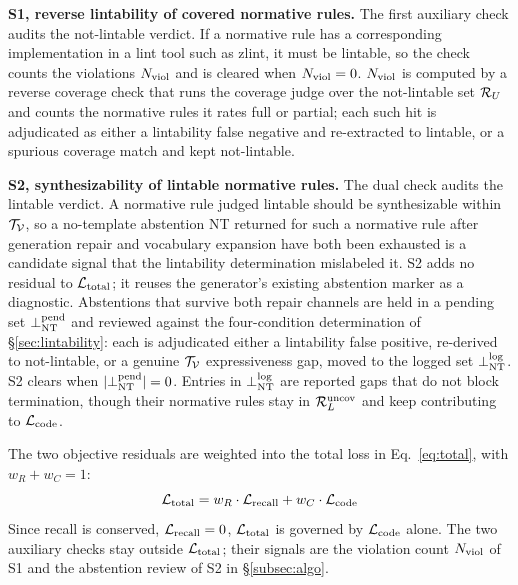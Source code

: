 \medskip
\noindent\textbf{S1, reverse lintability of covered normative rules.} The first
auxiliary check audits the not-lintable verdict. If a normative rule has a corresponding
implementation in a lint tool such as zlint, it must be lintable, so the check
counts the violations $N_{\mathrm{viol}}$ and is cleared when $N_{\mathrm{viol}} = 0$. $N_{\mathrm{viol}}$ is
computed by a reverse coverage check that runs the coverage judge over
the not-lintable set $\mathcal{R}_U$ and counts the normative rules it rates full or partial; each
such hit is adjudicated as either a lintability false negative and re-extracted to
lintable, or a spurious coverage match and kept not-lintable.

\medskip
\noindent\textbf{S2, synthesizability of lintable normative rules.} The dual check
audits the lintable verdict. A normative rule judged lintable should be synthesizable
within $\mathcal{T}_{\mathcal{V}}$, so a no-template abstention NT returned for such a
normative rule after generation repair and vocabulary expansion
have both been exhausted is a candidate signal that the lintability determination
mislabeled it.
S2 adds no residual to $\mathcal{L}_{\mathrm{total}}$; it reuses the generator's existing abstention
marker as a diagnostic. Abstentions that survive both repair channels are held
in a pending set $\bot_{\mathrm{NT}}^{\mathrm{pend}}$ and reviewed against the four-condition determination
of \S\ref{sec:lintability}: each is adjudicated either a lintability false
positive, re-derived to not-lintable, or a genuine $\mathcal{T}_{\mathcal{V}}$ expressiveness gap,
moved to the logged set $\bot_{\mathrm{NT}}^{\mathrm{log}}$. S2 clears when $|\bot_{\mathrm{NT}}^{\mathrm{pend}}| = 0$. Entries in
$\bot_{\mathrm{NT}}^{\mathrm{log}}$ are reported gaps that do not block termination, though their normative
rules stay in $\mathcal{R}_L^{\mathrm{uncov}}$ and keep contributing to $\mathcal{L}_{\mathrm{code}}$.

\medskip
The two objective residuals are weighted into the total loss in
Eq.~\eqref{eq:total}, with $w_R + w_C = 1$:
\begin{equation}\label{eq:total}
  \mathcal{L}_{\mathrm{total}} = w_R\cdot\mathcal{L}_{\mathrm{recall}} + w_C\cdot\mathcal{L}_{\mathrm{code}}
\end{equation}
Since recall is conserved, $\mathcal{L}_{\mathrm{recall}} = 0$, $\mathcal{L}_{\mathrm{total}}$ is governed by $\mathcal{L}_{\mathrm{code}}$ alone.
The two auxiliary checks stay outside $\mathcal{L}_{\mathrm{total}}$; their signals are the violation
count $N_{\mathrm{viol}}$ of S1 and the abstention review of S2 in \S\ref{subsec:algo}.

